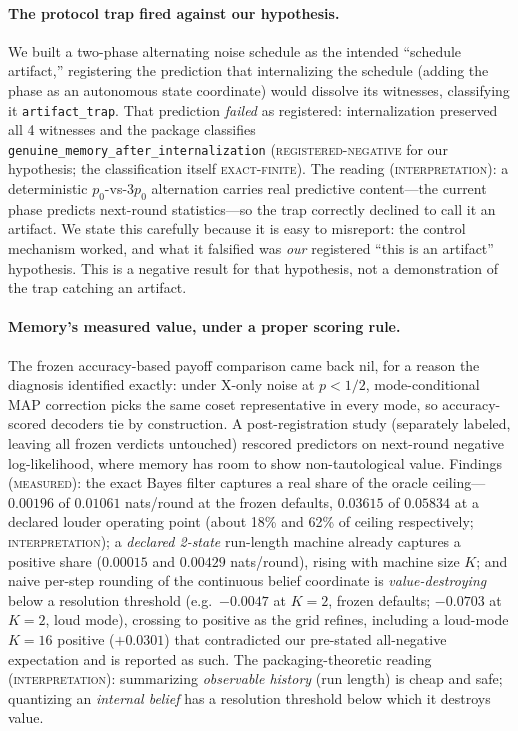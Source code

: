 \documentclass[11pt]{article}
\newcommand{\grade}[1]{\textsc{#1}}
\newcommand{\gExact}{\grade{exact-finite}}
\newcommand{\gMeasured}{\grade{measured}}
\newcommand{\gRegNeg}{\grade{registered-negative}}
\newcommand{\gInterp}{\grade{interpretation}}
\theoremstyle{definition}
\begin{document}
\paragraph{The protocol trap fired against our hypothesis.} We built a two-phase alternating noise schedule as the intended ``schedule artifact,'' registering the prediction that internalizing the schedule (adding the phase as an autonomous state coordinate) would dissolve its witnesses, classifying it \texttt{artifact\_trap}. That prediction \emph{failed} as registered: internalization preserved all 4 witnesses and the package classifies \texttt{genuine\_memory\_after\_internalization} (\gRegNeg{} for our hypothesis; the classification itself \gExact). The reading (\gInterp): a deterministic $p_0$-vs-$3p_0$ alternation carries real predictive content---the current phase predicts next-round statistics---so the trap correctly declined to call it an artifact. We state this carefully because it is easy to misreport: the control mechanism worked, and what it falsified was \emph{our} registered ``this is an artifact'' hypothesis. This is a negative result for that hypothesis, not a demonstration of the trap catching an artifact. 

\paragraph{Memory's measured value, under a proper scoring rule.} The frozen accuracy-based payoff comparison came back nil, for a reason the diagnosis identified exactly: under X-only noise at $p < 1/2$, mode-conditional MAP correction picks the same coset representative in every mode, so accuracy-scored decoders tie by construction. A post-registration study (separately labeled, leaving all frozen verdicts untouched) rescored predictors on next-round negative log-likelihood, where memory has room to show non-tautological value. Findings (\gMeasured): the exact Bayes filter captures a real share of the oracle ceiling---$0.00196$ of $0.01061$ nats/round at the frozen defaults, $0.03615$ of $0.05834$ at a declared louder operating point (about 18\% and 62\% of ceiling respectively; \gInterp); a \emph{declared 2-state} run-length machine already captures a positive share ($0.00015$ and $0.00429$ nats/round), rising with machine size $K$; and naive per-step rounding of the continuous belief coordinate is \emph{value-destroying} below a resolution threshold (e.g.\ $-0.0047$ at $K{=}2$, frozen defaults; $-0.0703$ at $K{=}2$, loud mode), crossing to positive as the grid refines, including a loud-mode $K{=}16$ positive ($+0.0301$) that contradicted our pre-stated all-negative expectation and is reported as such. The packaging-theoretic reading (\gInterp): summarizing \emph{observable history} (run length) is cheap and safe; quantizing an \emph{internal belief} has a resolution threshold below which it destroys value.
\end{document}
